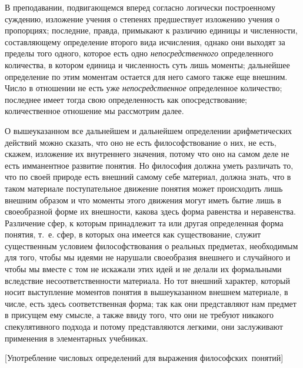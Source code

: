 В преподавании, подвигающемся вперед согласно логически построенному суждению,
изложение учения о степенях предшествует изложению учения о пропорциях;
последние, правда, примыкают к различию единицы и численности, составляющему
определение второго вида исчисления, однако они выходят за пределы того одного,
которое есть одно {\em непосредственного} определенного количества, в котором
единица и численность суть лишь моменты; дальнейшее определение по этим
моментам остается для него самого также еще внешним. Число в отношении не
есть уже {\em непосредственное} определенное количество; последнее имеет тогда
свою определенность как опосредствование; количественное отношение мы
рассмотрим далее.

О вышеуказанном все дальнейшем и дальнейшем определении арифметических действий
можно сказать, что оно не есть философствование о них, не есть, скажем,
изложение их внутреннего значения, потому что оно на самом деле не есть
имманентное развитие понятия. Но философия должна уметь различать то, что по
своей природе есть внешний самому себе материал, должна знать, что в таком
материале поступательное движение понятия может происходить лишь внешним
образом и что моменты этого движения могут иметь бытие лишь в своеобразной
форме их внешности, какова здесь форма равенства и неравенства. Различение
сфер, к которым принадлежит та или другая определенная форма понятия, т.~е.
сфер, в которых она имеется как существование, служит существенным условием
философствования о реальных предметах, необходимым для того, чтобы мы идеями не
нарушали своеобразия внешнего и случайного и чтобы мы вместе с том не искажали
этих идей и не делали их формальными вследствие несоответственности материала.
Но тот внешний характер, который носит выступление моментов понятия в
вышеуказанном внешнем материале, в числе, есть здесь соответственная форма; так
как они представляют нам предмет в присущем ему смысле, а также ввиду того, что
они не требуют никакого спекулятивного подхода и потому представляются легкими,
они заслуживают применения в элементарных учебниках.

%
{[Употребление числовых определений для выражения философских~понятий]}

